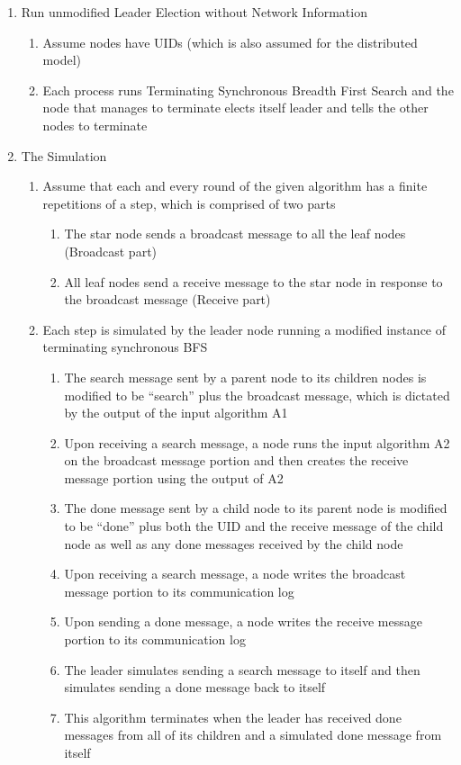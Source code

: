 \documentclass[english]{article}
\begin{document}
\begin{enumerate}
\item Run unmodified Leader Election without Network Information 

  \begin{enumerate}
  \item Assume nodes have UIDs (which is also assumed for the distributed model)
  \item Each process runs Terminating Synchronous Breadth First Search and the node that manages to terminate elects itself leader and tells the other nodes to terminate
  \end{enumerate}

\item The Simulation

  \begin{enumerate}
  \item Assume that each and every round of the given algorithm has a finite repetitions of a step, which is comprised of two parts
    \begin{enumerate}
    \item The star node sends a broadcast message to all the leaf nodes (Broadcast part)
    \item All leaf nodes send a receive message to the star node in response to the broadcast message (Receive part)
    \end{enumerate}

  \item Each step is simulated by the leader node running a modified instance of terminating synchronous BFS
    \begin{enumerate}
    \item The search message sent by a parent node to its children nodes is modified to be ``search'' plus the broadcast message, which is dictated by the output of the input algorithm A1
    \item Upon receiving a search message, a node runs the input algorithm A2 on the broadcast message portion and then creates the receive message portion using the output of A2
    \item The done message sent by a child node to its parent node is modified to be ``done'' plus both the UID and the receive message of the child node as well as any done messages received by the child node 
    \item Upon receiving a search message, a node writes the broadcast message portion to its communication log
    \item Upon sending a done message, a node writes the receive message portion to its communication log
    \item The leader simulates sending a search message to itself and then simulates sending a done message back to itself
    \item This algorithm terminates when the leader has received done messages from all of its children and a simulated done message from itself
    \end{enumerate}

  \end{enumerate}

\end{enumerate}
\end{document}
